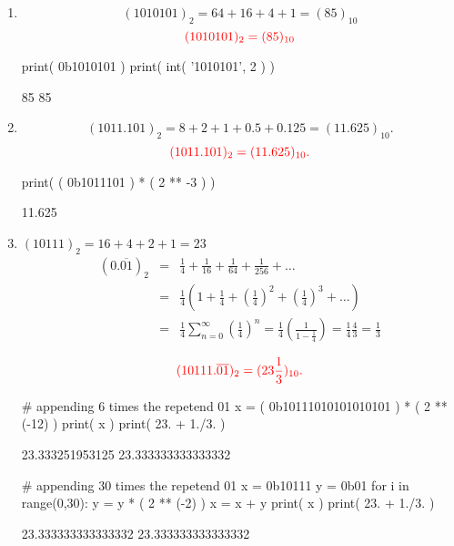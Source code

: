 \documentclass[pdftex,11pt]{article}
\begin{document}
\begin{enumerate}
\item
$$ (1010101)_2 = 64+16+4+1 = (85)_{10}$$
$$\color{red} (1010101)_2 =  (85)_{10}$$

\begin{python}
print( 0b1010101 )
print( int( '1010101', 2 ) )
\end{python}
\begin{pythonoutput}
85
85
\end{pythonoutput}


\item
$$(1011.101)_2 = 8+2+1+0.5+0.125 = (11.625)_{10} .$$
$$\color{red}(1011.101)_2 = (11.625)_{10} .$$


\begin{python}
print( ( 0b1011101 ) * ( 2 ** -3 ) )
\end{python}
\begin{pythonoutput}
11.625
\end{pythonoutput}






\item 
$(10111)_2 = 16+4+2+1 = 23$
\begin{eqnarray}
(0.\overline{01})_{2} 
\nonumber & = & \frac{1}{4}+ \frac{1}{16}+ \frac{1}{64}+ \frac{1}{256}+\ldots\\
\nonumber & = & \frac{1}{4}\left(1 + \frac{1}{4}+ \left(\frac{1}{4}\right)^2+ \left(\frac{1}{4}\right)^3+\ldots \right)\\
\nonumber & = & \frac{1}{4}\sum_{n=0}^\infty\left(\frac{1}{4}\right)^n
 = \frac{1}{4}\left(\frac{1}{1-\frac{1}{4}}\right)
 = \frac{1}{4}\frac{4}{3}
 = \frac{1}{3}
\end{eqnarray}



$$\color{red}(10111.\overline{01})_2 = (23\frac{1}{3})_{10} .$$

\begin{python}
# appending 6 times the repetend 01
x = ( 0b10111010101010101 ) * ( 2 ** (-12) )
print( x )
print( 23. + 1./3. )
\end{python}
\begin{pythonoutput}
23.333251953125
23.333333333333332
\end{pythonoutput}

\begin{python}
# appending 30 times the repetend 01
x = 0b10111
y = 0b01
for i in range(0,30):
  y = y * ( 2 ** (-2) )
  x = x + y
print( x )
print( 23. + 1./3. )
\end{python}
\begin{pythonoutput}
23.333333333333332
23.333333333333332
\end{pythonoutput}








\end{enumerate}
\end{document}
